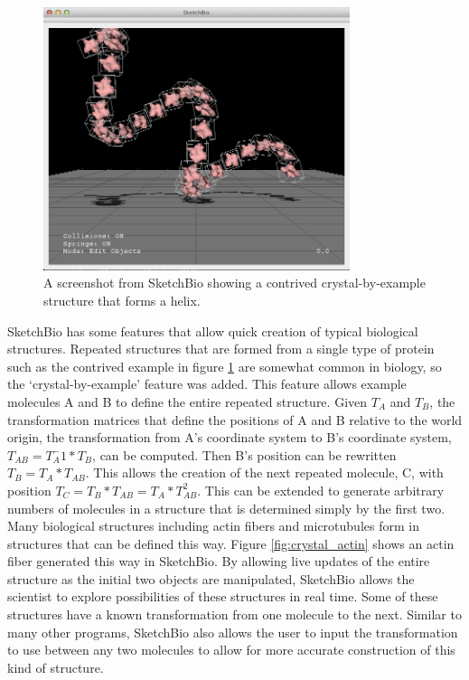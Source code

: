 \documentclass{article} %
\begin{document}
\begin{figure}[h]
\centering
\includegraphics[width=0.8\textwidth]{crystalByExample.png}
\caption{A screenshot from SketchBio showing a contrived crystal-by-example structure that forms a helix.}
\label{fig:crystal_by_example}
\end{figure}
SketchBio has some features that allow quick creation of typical biological structures.  Repeated structures that are formed from a single type of protein such as the contrived example in figure \ref{fig:crystal_by_example} are somewhat common in biology, so the ‘crystal-by-example' feature was added.  This feature allows example molecules A and B to define the entire repeated structure.  Given $T_A$ and $T_B$, the transformation matrices that define the positions of A and B relative to the world origin, the transformation from A's coordinate system to B's coordinate system, $T_{AB} = T_A^-1*T_B$, can be computed.  Then B's position can be rewritten $T_B = T_A*T_{AB}$.  This allows the creation of the next repeated molecule, C, with position $T_C = T_B*T_{AB} = T_A*T_{AB}^2$.  This can be extended to generate arbitrary numbers of molecules in a structure that is determined simply by the first two.  Many biological structures including actin fibers and microtubules form in structures that can be defined this way.  Figure \ref{fig:crystal_actin} shows an actin fiber generated this way in SketchBio.  By allowing live updates of the entire structure as the initial two objects are manipulated, SketchBio allows the scientist to explore possibilities of these structures in real time.  Some of these structures have a known transformation from one molecule to the next.  Similar to many other programs, SketchBio also allows the user to input the transformation to use between any two molecules to allow for more accurate construction of this kind of structure.
\end{document}
